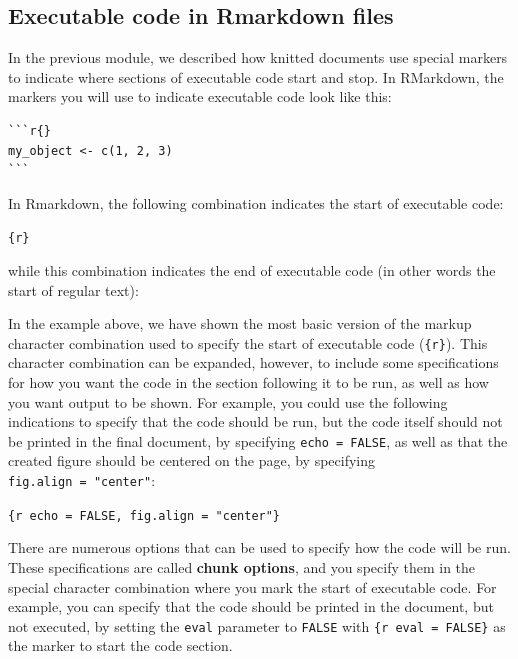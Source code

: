 \documentclass[]{tufte-book}
\begin{document}
\subsection{Executable code in Rmarkdown files}\label{executable-code-in-rmarkdown-files}

In the previous module, we described how knitted documents use special markers
to indicate where sections of executable code start and stop. In RMarkdown,
the markers you will use to indicate executable code look like this:

\begin{verbatim}
```r{}
my_object <- c(1, 2, 3)
```
\end{verbatim}

In Rmarkdown, the following combination indicates
the start of executable code:

\texttt{\textasciigrave{}\textasciigrave{}\textasciigrave{}\{r\}}

\noindent while this combination indicates the end of executable code (in other
words the start of regular text):

\texttt{\textasciigrave{}\textasciigrave{}\textasciigrave{}}

In the example above, we have shown the most basic
version of the markup character combination used to specify the start of
executable code (\texttt{\textasciigrave{}\textasciigrave{}\textasciigrave{}\{r\}}). This character combination can be expanded,
however, to include some specifications for how you want the code in the section
following it to be run, as well as how you want output to be shown. For example,
you could use the following indications to specify that the code should be run,
but the code itself should not be printed in the final document, by specifying
\texttt{echo\ =\ FALSE}, as well as that the created figure should be centered on the
page, by specifying \texttt{fig.align\ =\ "center"}:

\texttt{\textasciigrave{}\textasciigrave{}\textasciigrave{}\{r\ echo\ =\ FALSE,\ fig.align\ =\ "center"\}}

There are numerous options that can be used to specify how the code will be run.
These specifications are called
\textbf{chunk options}, and you specify them in the special character combination
where you mark the start of executable code. For example, you can specify that
the code should be printed in the document, but not executed, by setting the
\texttt{eval} parameter to \texttt{FALSE} with \texttt{\textasciigrave{}\textasciigrave{}\textasciigrave{}\{r\ eval\ =\ FALSE\}} as the marker to
start the code section.
\end{document}
